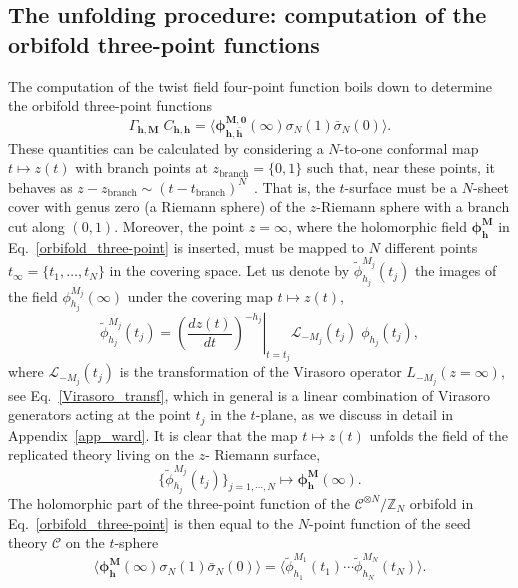 \documentclass[a4paper,11pt]{article}
\begin{document}
\subsection{The unfolding procedure: computation of the orbifold three-point functions}
The computation of the twist field four-point function boils down to determine the 
orbifold three-point functions
\begin{equation}\label{orbifold_three-point}
 \Gamma_{\boldsymbol{h},\boldsymbol{M}} \;C_{\boldsymbol{h},\boldsymbol{h}} = \langle \boldsymbol{\phi}^{\boldsymbol{M},\boldsymbol{0}}_{\boldsymbol{h},\boldsymbol{\bar{h}}}(\infty) \sigma_{N}(1)\bar{\sigma}_{N}(0)\rangle.
\end{equation}
These quantities can be calculated by considering a $N$-to-one conformal map
$t\mapsto z(t)$ with branch points at $z_{\text{branch}}=\{0, 1\}$ such that, 
near these points, it behaves as $z-z_{\text{branch}}\sim (t-t_{\text{branch}})^N$~\cite{Lunin}.
That is, the $t$-surface must be a $N$-sheet cover with genus zero (a Riemann sphere) of the $z$-Riemann sphere with a branch cut along 
$(0,1)$.  Moreover, the point $z=\infty$, where the holomorphic field $\boldsymbol{\phi}^{\boldsymbol{M}}_{\boldsymbol{h}}$
in Eq.~\eqref{orbifold_three-point} is inserted, must be mapped to $N$ different points $t_\infty=\{t_1, \dots, t_N\}$ in 
the covering space. Let us denote by $\tilde{\phi}_{h_j}^{M_j}(t_j)$ the images
of the field $\phi_{h_j}^{M_j}(\infty)$ under the covering map $t\mapsto z(t)$,
\begin{equation}
\label{Jac}
\tilde{\phi}_{h_j}^{M_j}(t_j) = \left.\left(\frac{d z(t)}{d t}
 \right)^{-h_j}\right|_{t=t_j} \mathcal{L}_{-M_j}(t_j)\;\phi_{h_j} (t_j),
\end{equation}
where $\mathcal{L}_{-M_j}(t_j)$ is the transformation of the Virasoro operator
$L_{-M_j}(z=\infty)$, see Eq.~\eqref{Virasoro_transf},  which in general is a linear combination of Virasoro generators
acting at the point $t_j$ in the $t$-plane, as we discuss in detail in Appendix~\ref{app_ward}.
It is clear that the map $t\mapsto z(t)$ unfolds the field of the replicated theory living on the $z$- Riemann surface,
\begin{equation}
\{\tilde{\phi}_{h_j}^{M_j}(t_j)\}_{j=1,\cdots,N}\mapsto \boldsymbol{\phi}_{\boldsymbol{h}}^{\boldsymbol{M}}(\infty).
\end{equation}
The holomorphic part of the three-point function of the $\mathcal{C}^{\otimes N}/\mathbb{Z}_N$ orbifold in Eq.~\eqref{orbifold_three-point}
is then equal to the $N$-point function of the seed theory $\mathcal{C}$ on the $t$-sphere
\begin{equation}\label{N-point}
\langle \boldsymbol{\phi}^{\boldsymbol{M}}_{\boldsymbol{h}}(\infty) \sigma_{N}(1)\bar{\sigma}_{N}(0)\rangle=\langle \tilde{\phi}^{M_1}_{h_1}(t_1)\cdots\tilde{\phi}_{h_N}^{M_N}(t_N)\rangle.
\end{equation}
\end{document}

